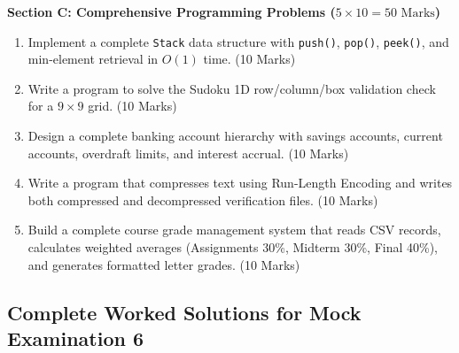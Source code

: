 \begin{mockexam}
\medskip
\noindent\textbf{Section C: Comprehensive Programming Problems ($5 \times 10 = 50\text{ Marks}$)}
\begin{enumerate}[leftmargin=1.5em, start=17]
    \item Implement a complete \texttt{Stack} data structure with \texttt{push()}, \texttt{pop()}, \texttt{peek()}, and min-element retrieval in $O(1)$ time. (10 Marks)
    \item Write a program to solve the Sudoku 1D row/column/box validation check for a $9 \times 9$ grid. (10 Marks)
    \item Design a complete banking account hierarchy with savings accounts, current accounts, overdraft limits, and interest accrual. (10 Marks)
    \item Write a program that compresses text using Run-Length Encoding and writes both compressed and decompressed verification files. (10 Marks)
    \item Build a complete course grade management system that reads CSV records, calculates weighted averages (Assignments 30\%, Midterm 30\%, Final 40\%), and generates formatted letter grades. (10 Marks)
\end{enumerate}
\end{mockexam}

\subsection{Complete Worked Solutions for Mock Examination 6}

